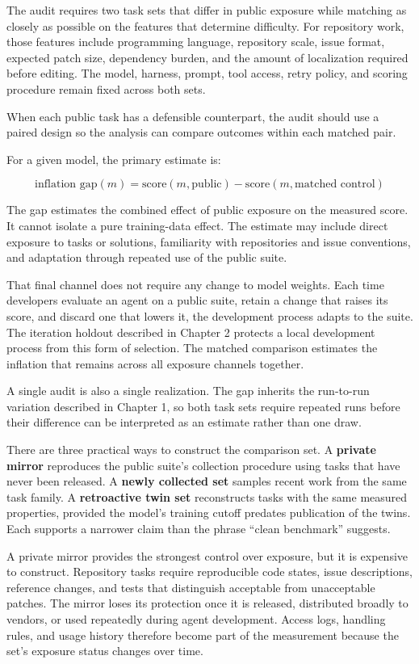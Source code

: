The audit requires two task sets that differ in public exposure while matching as closely as possible on the features that determine difficulty. For repository work, those features include programming language, repository scale, issue format, expected patch size, dependency burden, and the amount of localization required before editing. The model, harness, prompt, tool access, retry policy, and scoring procedure remain fixed across both sets.

When each public task has a defensible counterpart, the audit should use a paired design so the analysis can compare outcomes within each matched pair.

For a given model, the primary estimate is:

\[
  \text{inflation gap}(m) = \text{score}(m, \text{public}) - \text{score}(m, \text{matched control})
\]

The gap estimates the combined effect of public exposure on the measured score. It cannot isolate a pure training-data effect. The estimate may include direct exposure to tasks or solutions, familiarity with repositories and issue conventions, and adaptation through repeated use of the public suite.

That final channel does not require any change to model weights. Each time developers evaluate an agent on a public suite, retain a change that raises its score, and discard one that lowers it, the development process adapts to the suite. The iteration holdout described in Chapter 2 protects a local development process from this form of selection. The matched comparison estimates the inflation that remains across all exposure channels together.

A single audit is also a single realization. The gap inherits the run-to-run variation described in Chapter 1, so both task sets require repeated runs before their difference can be interpreted as an estimate rather than one draw.

There are three practical ways to construct the comparison set. A \textbf{private mirror} reproduces the public suite's collection procedure using tasks that have never been released. A \textbf{newly collected set} samples recent work from the same task family. A \textbf{retroactive twin set} reconstructs tasks with the same measured properties, provided the model's training cutoff predates publication of the twins. Each supports a narrower claim than the phrase ``clean benchmark'' suggests.

A private mirror provides the strongest control over exposure, but it is expensive to construct. Repository tasks require reproducible code states, issue descriptions, reference changes, and tests that distinguish acceptable from unacceptable patches. The mirror loses its protection once it is released, distributed broadly to vendors, or used repeatedly during agent development. Access logs, handling rules, and usage history therefore become part of the measurement because the set's exposure status changes over time.

